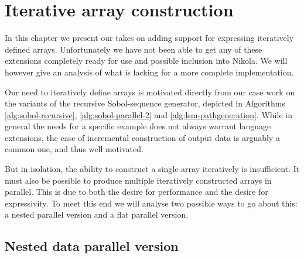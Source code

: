 \chapter{Iterative array construction}
\label{chap:unfold}


In this chapter we present our takes on adding support for expressing
iteratively defined arrays. Unfortunately we have not been able to get any of these
extensions completely ready for use and possible inclusion into Nikola.  We
will however give an analysis of what is lacking for a more complete
implementation.

Our need to iteratively define arrays is motivated directly from our case work
on the variants of the recursive Sobol-sequence generator, depicted in
Algorithms \ref{alg:sobol-recursive}, \ref{alg:sobol-parallel-2} and
\ref{alg:lsm-pathgeneration}. While in general the needs for a specific example
does not always warrant language extensions, the case of incremental
construction of output data is arguably a common one, and thus well motivated.

But in isolation, the ability to construct a single array iteratively is
insufficient. It must also be possible to produce multiple iteratively
constructed arrays in parallel. This is due to both the desire for performance and
the desire for expressivity. To meet this end we will analyse two possible ways
to go about this: a nested parallel version and a flat parallel version.

\section{Nested data parallel version}
\label{sec:unfold-mapNest}


